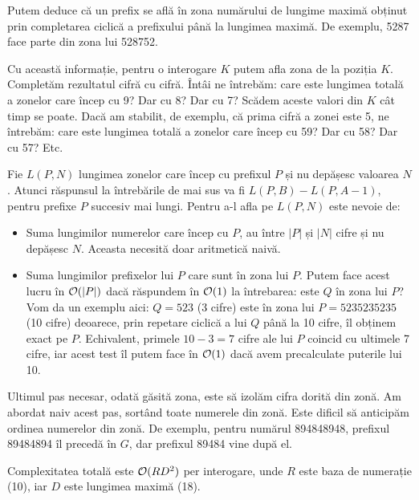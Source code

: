 \documentclass[../main.tex]{subfiles}
\begin{document}
Putem deduce că un prefix se află în zona numărului de lungime maximă obținut prin completarea ciclică a prefixului până la lungimea maximă. De exemplu, 5287 face parte din zona lui 528752.

Cu această informație, pentru o interogare $K$ putem afla zona de la poziția $K$. Completăm rezultatul cifră cu cifră. Întâi ne întrebăm: care este lungimea totală a zonelor care încep cu 9? Dar cu 8? Dar cu 7? Scădem aceste valori din $K$ cât timp se poate. Dacă am stabilit, de exemplu, că prima cifră a zonei este 5, ne întrebăm: care este lungimea totală a zonelor care încep cu 59? Dar cu 58? Dar cu 57? Etc.

Fie $L(P, N)$ lungimea zonelor care încep cu prefixul $P$ și nu depășesc valoarea $N$. Atunci răspunsul la întrebările de mai sus va fi $L(P, B) - L(P, A-1)$, pentru prefixe $P$ succesiv mai lungi. Pentru a-l afla pe $L(P,N)$ este nevoie de:

\begin{itemize}
  \item Suma lungimilor numerelor care încep cu $P$, au între $|P|$ și $|N|$ cifre și nu depășesc $N$. Aceasta necesită doar aritmetică naivă.
  \item Suma lungimilor prefixelor lui $P$ care sunt în zona lui $P$. Putem face acest lucru în $\mathcal{O}(|P|)$ dacă răspundem în $\mathcal{O}(1)$ la întrebarea: este $Q$ în zona lui $P$? Vom da un exemplu aici: $Q=523$ (3 cifre) este în zona lui $P = 5235235235$ (10 cifre) deoarece, prin repetare ciclică a lui $Q$ până la 10 cifre, îl obținem exact pe $P$. Echivalent, primele $10-3=7$ cifre ale lui $P$ coincid cu ultimele 7 cifre, iar acest test îl putem face în $\mathcal{O}(1)$ dacă avem precalculate puterile lui 10.
\end{itemize}

Ultimul pas necesar, odată găsită zona, este să izolăm cifra dorită din zonă. Am abordat naiv acest pas, sortând toate numerele din zonă. Este dificil să anticipăm ordinea numerelor din zonă. De exemplu, pentru numărul 894848948, prefixul 89484894 îl precedă în $G$, dar prefixul 89484 vine după el.

Complexitatea totală este $\mathcal{O}(R D^2)$ per interogare, unde $R$ este baza de numerație (10), iar $D$ este lungimea maximă (18).
\end{document}
